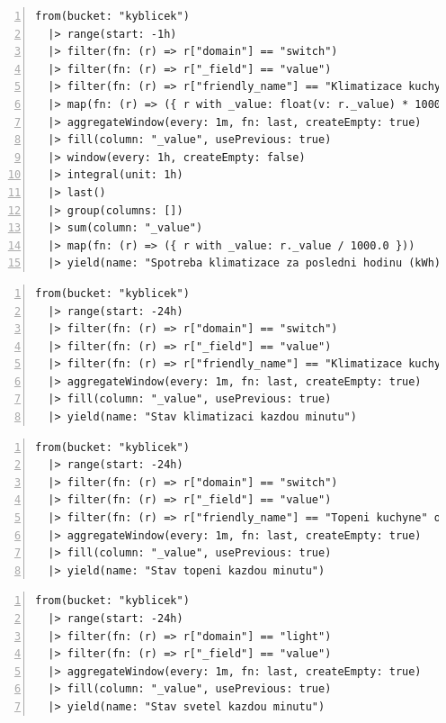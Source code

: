 \begin{lstlisting}[language=flux, breaklines=true, numbers=left, numberstyle=\small, numbersep=10pt, frame=single, basicstyle=\ttfamily\small, caption={Grafana - Rozložení spotřeby}, label={lst:grafanaSpotreba}]
from(bucket: "kyblicek")
  |> range(start: -1h)
  |> filter(fn: (r) => r["domain"] == "switch")
  |> filter(fn: (r) => r["_field"] == "value")
  |> filter(fn: (r) => r["friendly_name"] == "Klimatizace kuchyne" or r["friendly_name"] == "Klimatizace pracovna" or r["friendly_name"] == "Klimatizace u televize")
  |> map(fn: (r) => ({ r with _value: float(v: r._value) * 1000.0 }))
  |> aggregateWindow(every: 1m, fn: last, createEmpty: true)
  |> fill(column: "_value", usePrevious: true)
  |> window(every: 1h, createEmpty: false)
  |> integral(unit: 1h)
  |> last()
  |> group(columns: [])
  |> sum(column: "_value")
  |> map(fn: (r) => ({ r with _value: r._value / 1000.0 }))
  |> yield(name: "Spotreba klimatizace za posledni hodinu (kWh)")
\end{lstlisting}
\pagebreak
\begin{lstlisting}[language=flux, breaklines=true, numbers=left, numberstyle=\small, numbersep=10pt, frame=single, basicstyle=\ttfamily\small, caption={Grafana - Spínání klimatizace}, label={lst:grafanaKlimatizace}]
from(bucket: "kyblicek")
  |> range(start: -24h)
  |> filter(fn: (r) => r["domain"] == "switch")
  |> filter(fn: (r) => r["_field"] == "value")
  |> filter(fn: (r) => r["friendly_name"] == "Klimatizace kuchyne" or r["friendly_name"] == "Klimatizace pracovna" or r["friendly_name"] == "Klimatizace u televize")
  |> aggregateWindow(every: 1m, fn: last, createEmpty: true)
  |> fill(column: "_value", usePrevious: true)
  |> yield(name: "Stav klimatizaci kazdou minutu")
\end{lstlisting}
\begin{lstlisting}[language=flux, breaklines=true, numbers=left, numberstyle=\small, numbersep=10pt, frame=single, basicstyle=\ttfamily\small, caption={Grafana - Spínání topení}, label={lst:grafanaTopeni}]
from(bucket: "kyblicek")
  |> range(start: -24h)
  |> filter(fn: (r) => r["domain"] == "switch")
  |> filter(fn: (r) => r["_field"] == "value")
  |> filter(fn: (r) => r["friendly_name"] == "Topeni kuchyne" or r["friendly_name"] == "Topeni pracovna" or r["friendly_name"] == "Topeni u televize")
  |> aggregateWindow(every: 1m, fn: last, createEmpty: true)
  |> fill(column: "_value", usePrevious: true)
  |> yield(name: "Stav topeni kazdou minutu")
\end{lstlisting}
\begin{lstlisting}[language=flux, breaklines=true, numbers=left, numberstyle=\small, numbersep=10pt, frame=single, basicstyle=\ttfamily\small, caption={Grafana - Spínání světel}, label={lst:grafanaSvetla}]
from(bucket: "kyblicek")
  |> range(start: -24h)
  |> filter(fn: (r) => r["domain"] == "light")
  |> filter(fn: (r) => r["_field"] == "value")
  |> aggregateWindow(every: 1m, fn: last, createEmpty: true)
  |> fill(column: "_value", usePrevious: true)
  |> yield(name: "Stav svetel kazdou minutu")
\end{lstlisting}
